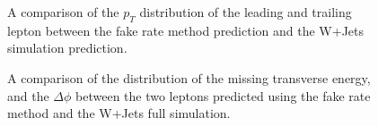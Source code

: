 \begin{figure}[!htbp]
\begin{center}
\caption{A comparison of the $p_{T}$ distribution of the leading and trailing lepton
between the fake rate method prediction and the W+Jets simulation prediction. }
\label{fig:FakeBkgDataDistribution_LeptonPt}
\end{center}
\end{figure}

\begin{figure}[!htbp]
\begin{center}
\caption{A comparison of the distribution of the missing transverse energy, 
and the $\Delta\phi$ between the two leptons predicted using the fake rate method and the
W+Jets full simulation.}
\label{fig:FakeBkgDataDistribution_MetAndDeltaPhi}
\end{center}
\end{figure}

